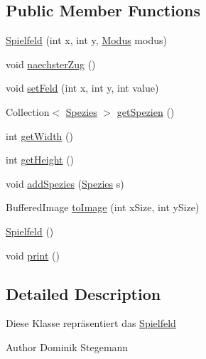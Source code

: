 \subsection*{Public Member Functions}
\begin{DoxyCompactItemize}
\item 
\hyperlink{classde_1_1gameoflife_1_1models_1_1Spielfeld_ae292ab73cd9e9b0e6102084288be1a45}{Spielfeld} (int x, int y, \hyperlink{enumde_1_1gameoflife_1_1enums_1_1Modus}{Modus} modus)
\item 
void \hyperlink{classde_1_1gameoflife_1_1models_1_1Spielfeld_a513855e9b09911917a5f11f84fb686d4}{naechster\-Zug} ()
\item 
void \hyperlink{classde_1_1gameoflife_1_1models_1_1Spielfeld_ae19781cbb6d157606db94af1e167c5c4}{set\-Feld} (int x, int y, int value)
\item 
Collection$<$ \hyperlink{classde_1_1gameoflife_1_1models_1_1Spezies}{Spezies} $>$ \hyperlink{classde_1_1gameoflife_1_1models_1_1Spielfeld_a3d8774b5ec35607b87da69825862afcd}{get\-Spezien} ()
\item 
int \hyperlink{classde_1_1gameoflife_1_1models_1_1Spielfeld_a3831b4f25a9a5af80dea3ff0eace3b31}{get\-Width} ()
\item 
int \hyperlink{classde_1_1gameoflife_1_1models_1_1Spielfeld_a2712bcacf808a1c72a13a5b4acd16f80}{get\-Height} ()
\item 
void \hyperlink{classde_1_1gameoflife_1_1models_1_1Spielfeld_a8b379477d7258a2e5212e08ca5788e42}{add\-Spezies} (\hyperlink{classde_1_1gameoflife_1_1models_1_1Spezies}{Spezies} s)
\item 
Buffered\-Image \hyperlink{classde_1_1gameoflife_1_1models_1_1Spielfeld_a70b0d3314d81ff0dac807022e8904702}{to\-Image} (int x\-Size, int y\-Size)
\item 
\hyperlink{classde_1_1gameoflife_1_1models_1_1Spielfeld_a5268961f4d7fb47c859171590adce899}{Spielfeld} ()
\item 
void \hyperlink{classde_1_1gameoflife_1_1models_1_1Spielfeld_af15f55bf729ba8acb978dba691ef1063}{print} ()
\end{DoxyCompactItemize}


\subsection{Detailed Description}
Diese Klasse repräsentiert das \hyperlink{classde_1_1gameoflife_1_1models_1_1Spielfeld}{Spielfeld} \begin{DoxyAuthor}{Author}
Dominik Stegemann 
\end{DoxyAuthor}


